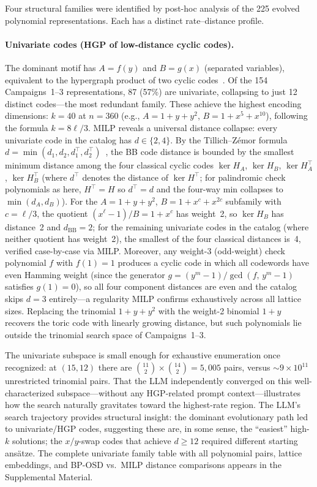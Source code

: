 \documentclass[aps,prxquantum,twocolumn,superscriptaddress,nofootinbib]{revtex4-2}
\begin{document}
Four structural families were identified by post-hoc analysis of the 225 evolved polynomial representations.
Each has a distinct rate--distance profile.

\paragraph{Univariate codes (HGP of low-distance cyclic codes).}
The dominant motif has $A = f(y)$ and $B = g(x)$ (separated variables), equivalent to the hypergraph product of two cyclic codes~\cite{eberhardt2024pruning,aydin2025cxc}.
Of the 154 Campaigns~1--3 representations, 87 (57\%) are univariate, collapsing to just 12 distinct codes---the most redundant family.
These achieve the highest encoding dimensions: $k = 40$ at $n = 360$ (e.g., $A = 1{+}y{+}y^2$, $B = 1{+}x^5{+}x^{10}$), following the formula $k = 8\ell/3$.
MILP reveals a universal distance collapse: every univariate code in the catalog has $d \in \{2, 4\}$.
By the Tillich--Z\'emor formula $d = \min(d_1, d_2, d_1^\top, d_2^\top)$~\cite{tillich2014quantum}, the BB code distance is bounded by the smallest minimum distance among the four classical cyclic codes $\ker H_A$, $\ker H_B$, $\ker H_A^\top$, $\ker H_B^\top$ (where $d^\top$ denotes the distance of $\ker H^\top$; for palindromic check polynomials as here, $H^\top = H$ so $d^\top = d$ and the four-way min collapses to $\min(d_A, d_B)$).
For the $A = 1{+}y{+}y^2$, $B = 1{+}x^c{+}x^{2c}$ subfamily with $c = \ell/3$, the quotient $(x^\ell{-}1)/B = 1{+}x^c$ has weight~2, so $\ker H_B$ has distance~2 and $d_{\text{BB}} = 2$; for the remaining univariate codes in the catalog (where neither quotient has weight~2), the smallest of the four classical distances is~4, verified case-by-case via MILP.
Moreover, any weight-3 (odd-weight) check polynomial $f$ with $f(1) = 1$ produces a cyclic code in which all codewords have even Hamming weight (since the generator $g = (y^m{-}1)/\gcd(f,\,y^m{-}1)$ satisfies $g(1) = 0$), so all four component distances are even and the catalog skips $d = 3$ entirely---a regularity MILP confirms exhaustively across all lattice sizes.
Replacing the trinomial $1{+}y{+}y^2$ with the weight-2 binomial $1{+}y$ recovers the toric code with linearly growing distance, but such polynomials lie outside the trinomial search space of Campaigns~1--3.

The univariate subspace is small enough for exhaustive enumeration once recognized: at $(15,12)$ there are $\binom{11}{2} \times \binom{14}{2} = 5{,}005$ pairs, versus ${\sim}9 \times 10^{11}$ unrestricted trinomial pairs.
That the LLM independently converged on this well-characterized subspace---without any HGP-related prompt context---illustrates how the search naturally gravitates toward the highest-rate region.
The LLM's search trajectory provides structural insight: the dominant evolutionary path led to univariate/HGP codes, suggesting these are, in some sense, the ``easiest'' high-$k$ solutions; the $x/y$-swap codes that achieve $d \geq 12$ required different starting ansätze.
The complete univariate family table with all polynomial pairs, lattice embeddings, and BP-OSD vs.\ MILP distance comparisons appears in the Supplemental Material.
\end{document}
